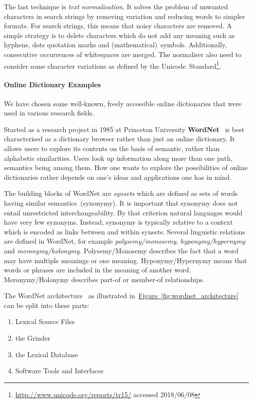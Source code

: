 \documentclass[draft,final]{vutinfth} %
\begin{document}
The last technique is \textit{text normalisation}. It solves the problem of unwanted characters in search strings by removing variation and reducing words to simpler formats. For search strings, this means that noisy characters are removed. A simple strategy is to delete characters which do not add any meaning such as hyphens, dots quotation marks and (mathematical)~symbols. Additionally, consecutive occurrences of whitespaces are merged. 
The normaliser also need to consider some character variations as defined by the Unicode~Standard\footnote{\url{http://www.unicode.org/reports/tr15/} accessed 2018/06/08 }. 

\paragraph{Online Dictionary Examples} We have chosen some well-known, freely accessible online dictionaries that were used in various research
fields.

Started as a research project in 1985 at Princeton University \textbf{WordNet}~\cite{fellbaum1998} is best characterised as a dictionary browser rather than just an online dictionary. It allows users to explore its contents on the basis of semantic, rather than alphabetic similarities. Users look up information along more than one path, semantics being among them. How one wants to explore the possibilities of online dictionaries rather depends on one's ideas and applications one has in mind. 

The building blocks of WordNet are \textit{synsets} which are defined as sets of words having similar semantics~(synonymy). It is important that synonymy does not entail unrestricted interchangeability. By that criterion natural languages would have very few synonyms. Instead, synonymy is typically relative to a context which is encoded as links between and within synsets. 
Several linguistic relations are defined in WordNet, for example \textit{polysemy/monosemy}, \textit{hyponymy/hypernymy} and \textit{meronymy/holonymy}. 
Polysemy/Monosemy describes the fact that a word may have multiple meanings or one meaning. Hyponymy/Hypernymy means that words or phrases are included in the meaning of another word. Meronymy/Holonymy describes part-of or member-of relationships.

The WordNet architecture~\cite{fellbaum1998} as illustrated in~\hyperref[fig:wordnet_architecture]{Figure~\ref*{fig:wordnet_architecture}} can be split into these parts:
\begin{enumerate}
		\item Lexical Source Files
		\item the Grinder
		\item the Lexical Database
		\item Software Tools and Interfaces
\end{enumerate}
\end{document}
